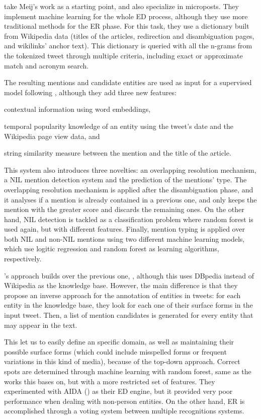\cite{yamada2015} take Meij's work as a starting point, and also specialize in microposts. They implement machine learning for the whole ED process, although they use more traditional methods for the ER phase. For this task, they use a dictionary built from Wikipedia data (titles of the articles, redirection and disambiguation pages, and wikilinks' anchor text). This dictionary is queried with all the n-grams from the tokenized tweet through multiple criteria, including exact or approximate match and acronym search.

The resulting mentions and candidate entities are used as input for a supervised model following \cite{meij2012}, although they add  three new features: 
%
\begin{enumerate*}
\item contextual information using word embeddings,
\item temporal popularity knowledge of an entity using the tweet's date and the Wikipedia page view data, and
\item string similarity measure between the mention and the title of the article.
\end{enumerate*}

This system also introduces three novelties: an overlapping resolution mechanism, a NIL mention detection system and the prediction of the mentions' type. The overlapping resolution mechanism is applied after the disambiguation phase, and it analyses if a mention is already contained in a previous one, and only keeps the mention with the greater score and discards the remaining ones. On the other hand, NIL detection is tackled as a classification problem where random forest is used again, but with different features. Finally, mention typing is applied over both NIL and non-NIL mentions using two different machine learning models, which use logitic regression and random forest as learning algorithms, respectively. 

\cite{greenfield2016}'s approach builds over the previous one, \cite{yamada2015}, although this uses DBpedia instead of Wikipedia as the knowledge base. However, the main difference is that they propose an inverse approach for the annotation of entities in tweets: for each entity in the knowledge base, they look for each one of their surface forms in the input tweet. Then, a list of mention candidates is generated for every entity that may appear in the text.

This let us to easily define an specific domain, as well as maintaining their possible surface forms (which could include misspelled forms or frequent variations in this kind of media), because of the top-down approach. Correct spots are determined through machine learning with random forest, same as the works this bases on, but with a more restricted set of features. They experimented with AIDA (\cite{yosef2011}) as their ED engine, but it provided very poor performance when dealing with non-person entities. On the other hand, ER is accomplished through a voting system between multiple recognitions systems.

